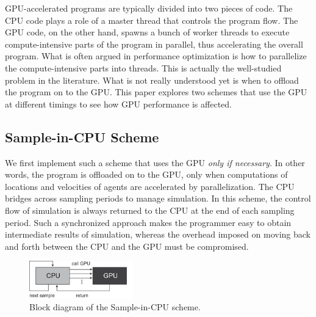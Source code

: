 \documentclass[times, 10pt, twocolumn]{article}
\begin{document}
GPU-accelerated programs are typically divided into two pieces of code.
The CPU code plays a role of a master thread that controls the program
flow.
The GPU code, on the other hand, spawns a bunch of worker threads to
execute compute-intensive parts of the program in parallel, thus
accelerating the overall program.
What is often argued in performance optimization is how to parallelize
the compute-intensive parts into threads.
This is actually the well-studied problem in the literature.
What is not really understood yet is when to offload the program on to
the GPU.
This paper explores two schemes that use the GPU at different timings to
see how GPU performance is affected.

\subsection{Sample-in-CPU Scheme}
\label{sec:sample-in-cpu}

We first implement such a scheme that uses the GPU \textit{only if
necessary}.
In other words, the program is offloaded on to the GPU, only when
computations of locations and velocities of agents are accelerated by
parallelization.
The CPU bridges across sampling periods to manage simulation.
In this scheme, the control flow of simulation is always returned to the
CPU at the end of each sampling period.
Such a synchronized approach makes the programmer easy to
obtain intermediate results of simulation, whereas the overhead imposed
on moving back and forth between the CPU and the GPU must be
compromised.

\begin{figure}[t]
\centering
\includegraphics[width=0.4\textwidth]{eps/sample-in-cpu.eps}
\caption{Block diagram of the Sample-in-CPU scheme.}
\label{fig:sample-in-cpu}
\end{figure}
\end{document}
